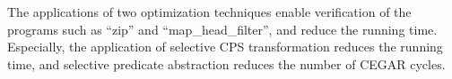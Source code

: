 
The applications of two optimization techniques enable verification of the
programs such as ``zip'' and ``map\_head\_filter'', and reduce the
running time.  Especially, the application of selective CPS
transformation reduces the running time, and selective predicate
abstraction reduces the number of CEGAR cycles.

